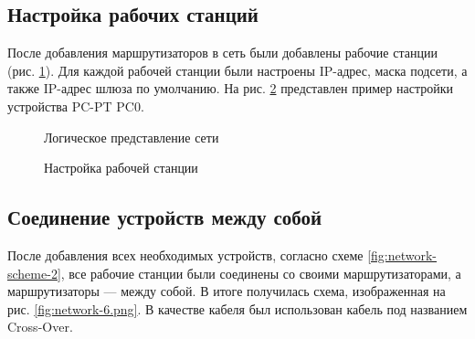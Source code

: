 \documentclass[a4paper, 14pt]{extarticle}
\begin{document}
\subsection{Настройка рабочих станций}

После добавления маршрутизаторов в сеть были добавлены рабочие станции (рис.
\ref{fig:network-4.png}). Для каждой рабочей станции были настроены IP-адрес,
маска подсети, а также IP-адрес шлюза по умолчанию. На рис.
\ref{fig:network-5.png} представлен пример настройки устройства PC-PT PC0.

\begin{figure}[H]
  \centering
  \caption{Логическое представление сети}
  \label{fig:network-4.png}
\end{figure}

\begin{figure}[H]
  \centering
  \caption{Настройка рабочей станции}
  \label{fig:network-5.png}
\end{figure}

\subsection{Соединение устройств между собой}

После добавления всех необходимых устройств, согласно схеме
\ref{fig:network-scheme-2}, все рабочие станции были соединены со своими
маршрутизаторами, а маршрутизаторы --- между собой. В итоге получилась схема,
изображенная на рис. \ref{fig:network-6.png}. В качестве кабеля был использован
кабель под названием Cross-Over.
\end{document}
